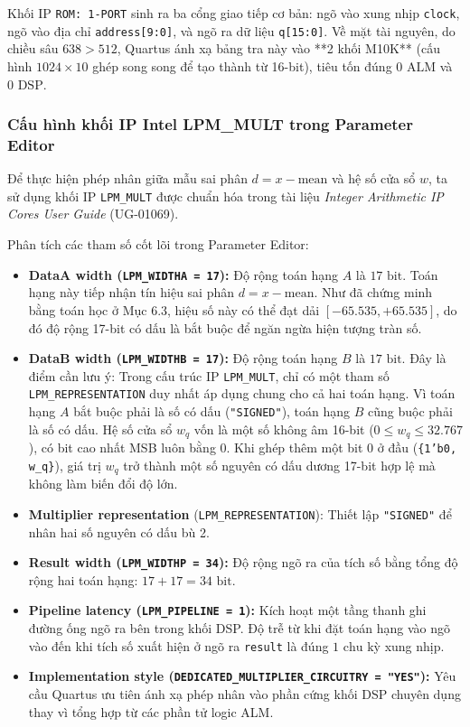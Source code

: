 Khối IP \texttt{ROM: 1-PORT} sinh ra ba cổng giao tiếp cơ bản: ngõ vào xung nhịp \texttt{clock}, ngõ vào địa chỉ \texttt{address[9:0]}, và ngõ ra dữ liệu \texttt{q[15:0]}. Về mặt tài nguyên, do chiều sâu $638 > 512$, Quartus ánh xạ bảng tra này vào **2 khối M10K** (cấu hình $1024 \times 10$ ghép song song để tạo thành từ 16-bit), tiêu tốn đúng $0\text{ ALM}$ và $0\text{ DSP}$.

\subsubsection*{Cấu hình khối IP Intel LPM\_MULT trong Parameter Editor}
Để thực hiện phép nhân giữa mẫu sai phân $d = x - \text{mean}$ và hệ số cửa sổ $w$, ta sử dụng khối IP \texttt{LPM\_MULT} được chuẩn hóa trong tài liệu \emph{Integer Arithmetic IP Cores User Guide} (UG-01069).

Phân tích các tham số cốt lõi trong Parameter Editor:
\begin{itemize}[leftmargin=1.5em, itemsep=3pt]
    \item \textbf{DataA width (\texttt{LPM\_WIDTHA = 17}):} Độ rộng toán hạng $A$ là $17\text{ bit}$. Toán hạng này tiếp nhận tín hiệu sai phân $d = x - \text{mean}$. Như đã chứng minh bằng toán học ở Mục 6.3, hiệu số này có thể đạt dải $[-65.535, +65.535]$, do đó độ rộng 17-bit có dấu là bắt buộc để ngăn ngừa hiện tượng tràn số.
    \item \textbf{DataB width (\texttt{LPM\_WIDTHB = 17}):} Độ rộng toán hạng $B$ là $17\text{ bit}$. Đây là điểm cần lưu ý: Trong cấu trúc IP \texttt{LPM\_MULT}, chỉ có một tham số \texttt{LPM\_REPRESENTATION} duy nhất áp dụng chung cho cả hai toán hạng. Vì toán hạng $A$ bắt buộc phải là số có dấu (\texttt{"SIGNED"}), toán hạng $B$ cũng buộc phải là số có dấu. Hệ số cửa sổ $w_q$ vốn là một số không âm 16-bit ($0 \le w_q \le 32.767$), có bit cao nhất MSB luôn bằng 0. Khi ghép thêm một bit 0 ở đầu (\texttt{\{1'b0, w\_q\}}), giá trị $w_q$ trở thành một số nguyên có dấu dương 17-bit hợp lệ mà không làm biến đổi độ lớn.
    \item \textbf{Multiplier representation} (\texttt{LPM\_REPRESENTATION}): Thiết lập \texttt{"SIGNED"} để nhân hai số nguyên có dấu bù 2.
    \item \textbf{Result width (\texttt{LPM\_WIDTHP = 34}):} Độ rộng ngõ ra của tích số bằng tổng độ rộng hai toán hạng: $17 + 17 = 34\text{ bit}$.
    \item \textbf{Pipeline latency (\texttt{LPM\_PIPELINE = 1}):} Kích hoạt một tầng thanh ghi đường ống ngõ ra bên trong khối DSP. Độ trễ từ khi đặt toán hạng vào ngõ vào đến khi tích số xuất hiện ở ngõ ra \texttt{result} là đúng $1\text{ chu kỳ}$ xung nhịp.
    \item \textbf{Implementation style (\texttt{DEDICATED\_MULTIPLIER\_CIRCUITRY = "YES"}):} Yêu cầu Quartus ưu tiên ánh xạ phép nhân vào phần cứng khối DSP chuyên dụng thay vì tổng hợp từ các phần tử logic ALM.
\end{itemize}

